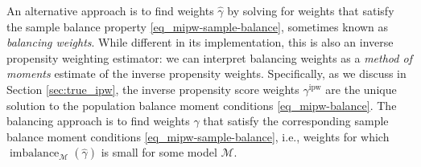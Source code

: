 \documentclass{article}
\theoremstyle{definition}
\newcommand{\ipw}{\text{ipw}}
\DeclareMathOperator{\imbalance}{imbalance}
\newcommand{\hgamma}{\ensuremath{\hat\gamma}}
\newcommand{\gammaipw}{\ensuremath{\gamma^{\ipw}}}
\newcommand{\model}{\mathcal{M}}
\newcommand{\<}{\langle}
\renewcommand{\>}{\rangle}
\newcommand\cmnt[2]{\;
{\textcolor{red}{[{\em #1 --- #2}] \;}
}}
\newcommand\avi[1]{\cmnt{#1}{Avi}}
\newcommand\dah[1]{\cmnt{#1}{Skip}}
\begin{document}
An alternative approach is to find weights $\hat{\gamma}$ by solving for weights that satisfy the sample balance property \eqref{eq_mipw-sample-balance}, sometimes known as \emph{balancing weights}.
While different in its implementation, this is also an inverse propensity weighting estimator:
we can interpret balancing weights as a \emph{method of moments} estimate of the inverse propensity weights.
Specifically, as we discuss in Section \ref{sec:true_ipw}, the inverse propensity score weights $\gammaipw$ are the unique solution to the population balance moment conditions \eqref{eq_mipw-balance}.
The balancing approach is to find
weights $\hgamma$ that satisfy
the corresponding sample balance moment conditions \eqref{eq_mipw-sample-balance},
i.e., weights for which $\imbalance_{\model}(\hat\gamma)$ is small for some model $\model$.
%
\end{document}

